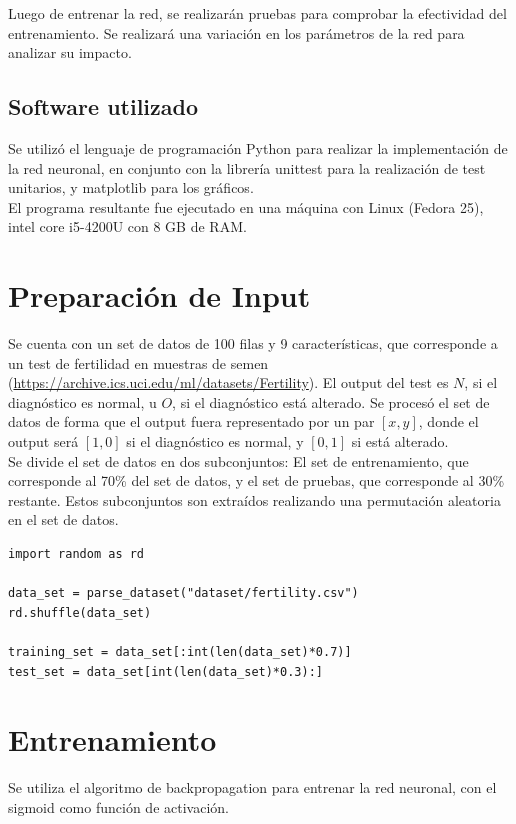 \documentclass[11pt,letterpaper]{article}
\begin{document}
Luego de entrenar la red, se realizarán pruebas para comprobar la efectividad
del entrenamiento. Se realizará una variación en los parámetros de la red para
analizar su impacto.

\subsection{Software utilizado}
Se utilizó el lenguaje de programación Python para realizar la implementación de
la red neuronal, en conjunto con la librería unittest para la realización de
test unitarios, y matplotlib para los gráficos.\\

El programa resultante fue ejecutado en una máquina con Linux (Fedora 25),
intel core i5-4200U con 8 GB de RAM.
\section{Preparación de Input}
Se cuenta con un set de datos de 100 filas y 9 características, que corresponde
a un test de fertilidad en muestras de semen (\url{https://archive.ics.uci.edu/ml/datasets/Fertility}).
El output del test es $N$, si el
diagnóstico es normal, u $O$, si el diagnóstico está alterado. Se procesó el
set de datos de forma que el output fuera representado por un par $[x,y]$,
donde el output será $[1,0]$ si el diagnóstico es normal, y $[0,1]$ si está
alterado.\\

Se divide el set de datos en dos subconjuntos: El set de entrenamiento, que
corresponde al 70\% del set de datos, y el set de pruebas, que corresponde al
30\% restante. Estos subconjuntos son extraídos realizando una permutación aleatoria en el
set de datos.

\begin{lstlisting}
import random as rd

data_set = parse_dataset("dataset/fertility.csv")
rd.shuffle(data_set)

training_set = data_set[:int(len(data_set)*0.7)]
test_set = data_set[int(len(data_set)*0.3):]
\end{lstlisting}

\section{Entrenamiento}
Se utiliza el algoritmo de backpropagation para entrenar la red neuronal, con el
sigmoid como función de activación.
\end{document}
